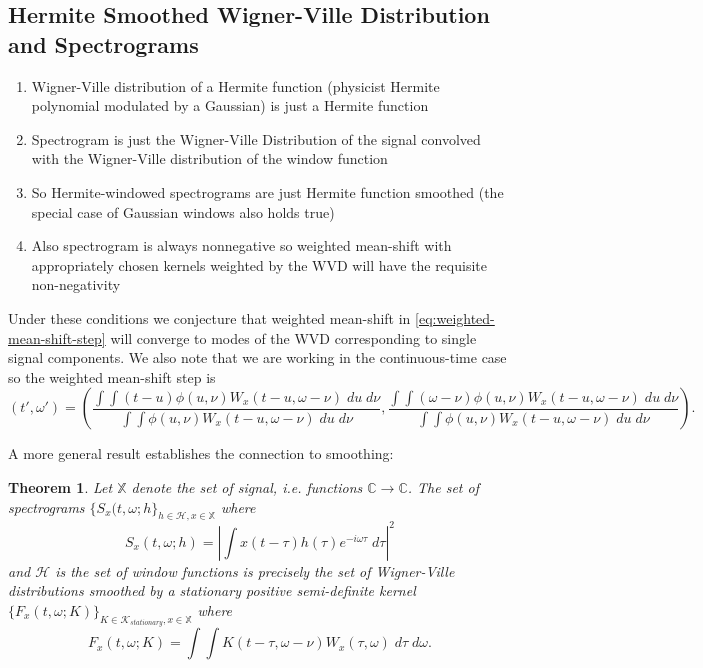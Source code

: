 \documentclass[english]{article}
\newtheorem{thm}{Theorem}[section]
\begin{document}
\subsection{Hermite Smoothed Wigner-Ville Distribution and Spectrograms}

\begin{enumerate}
\item Wigner-Ville distribution of a Hermite function (physicist Hermite polynomial modulated by a Gaussian) is just a Hermite function
\item Spectrogram is just the Wigner-Ville Distribution of the signal convolved with the Wigner-Ville distribution of the window function
\item So Hermite-windowed spectrograms are just Hermite function smoothed (the special case of Gaussian windows also holds true)
\item Also spectrogram is always nonnegative so weighted mean-shift with appropriately chosen kernels weighted by the WVD will have the
requisite non-negativity
\end{enumerate}

 Under these conditions
we conjecture that weighted mean-shift in \autoref{eq:weighted-mean-shift-step}
will converge to modes of the WVD corresponding to single signal components.  We also
note that we are working in the continuous-time case so the weighted mean-shift step is
\begin{equation}\label{continuous-wvd-mean-shift}
(t',\omega') =\left(\frac{\int \int (t-u)\phi(u,\nu) W_x(t-u,\omega-\nu)\; du\;d\nu}{\int \int \phi(u,\nu) W_x(t-u,\omega-\nu)\; du\;d\nu},
\frac{\int \int (\omega-\nu)\phi(u,\nu) W_x(t-u,\omega-\nu)\; du\;d\nu}{\int \int \phi(u,\nu) W_x(t-u,\omega-\nu)\; du\;d\nu}
\right).
\end{equation}

A more general result establishes the connection to smoothing:
\begin{thm}
Let $\mathbb{X}$ denote the set of signal, i.e. functions $\mathbb{C}\to\mathbb{C}$.
The set of spectrograms $\{ S_x(t,\omega; h\}_{h\in\mathcal{H},x\in\mathbb{X}}$ where
\begin{equation}
S_x(t,\omega ; h) = \left|\int x(t-\tau)h(\tau)e^{-i\omega\tau}\;d\tau\right|^2
\end{equation}
and $\mathcal{H}$ is the set of window functions
is precisely the set of Wigner-Ville distributions smoothed by a
stationary positive semi-definite kernel
$\{ F_x(t,\omega ; K)\}_{K\in\mathcal{K}_{stationary},x\in\mathbb{X}}$
where 
\begin{equation}
F_x(t,\omega ; K) = \int\int K(t-\tau,\omega-\nu) W_x(\tau,\omega)\;d\tau\;d\omega.
\end{equation}
\end{thm}
\end{document}
